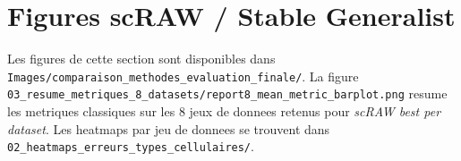 \section*{Figures scRAW / Stable Generalist}

Les figures de cette section sont disponibles dans \texttt{Images/comparaison_methodes_evaluation_finale/}.
La figure \texttt{03_resume_metriques_8_datasets/report8_mean_metric_barplot.png} resume les metriques classiques sur les 8 jeux de donnees retenus pour \textit{scRAW best per dataset}.
Les heatmaps par jeu de donnees se trouvent dans \texttt{02_heatmaps_erreurs_types_cellulaires/}.

